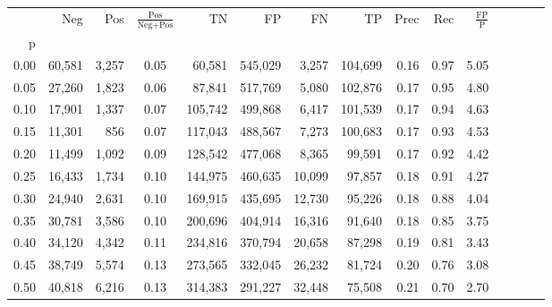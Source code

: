 \begin{tabular}{rrrcrrrrrrrrrrr}
\toprule
{} &     Neg &     Pos & $\frac{\text{Pos}}{\text{Neg}+\text{Pos}}$ &       TN &       FP &       FN &       TP &  Prec &   Rec & $\frac{\text{FP}}{\text{P}}$ \\
p    &         &         &                                            &          &          &          &          &       &       &                              \\
\midrule
0.00 &  60,581 &   3,257 &                                       0.05 &   60,581 &  545,029 &    3,257 &  104,699 &  0.16 &  0.97 &                         5.05 \\
0.05 &  27,260 &   1,823 &                                       0.06 &   87,841 &  517,769 &    5,080 &  102,876 &  0.17 &  0.95 &                         4.80 \\
0.10 &  17,901 &   1,337 &                                       0.07 &  105,742 &  499,868 &    6,417 &  101,539 &  0.17 &  0.94 &                         4.63 \\
0.15 &  11,301 &     856 &                                       0.07 &  117,043 &  488,567 &    7,273 &  100,683 &  0.17 &  0.93 &                         4.53 \\
0.20 &  11,499 &   1,092 &                                       0.09 &  128,542 &  477,068 &    8,365 &   99,591 &  0.17 &  0.92 &                         4.42 \\
0.25 &  16,433 &   1,734 &                                       0.10 &  144,975 &  460,635 &   10,099 &   97,857 &  0.18 &  0.91 &                         4.27 \\
0.30 &  24,940 &   2,631 &                                       0.10 &  169,915 &  435,695 &   12,730 &   95,226 &  0.18 &  0.88 &                         4.04 \\
0.35 &  30,781 &   3,586 &                                       0.10 &  200,696 &  404,914 &   16,316 &   91,640 &  0.18 &  0.85 &                         3.75 \\
0.40 &  34,120 &   4,342 &                                       0.11 &  234,816 &  370,794 &   20,658 &   87,298 &  0.19 &  0.81 &                         3.43 \\
0.45 &  38,749 &   5,574 &                                       0.13 &  273,565 &  332,045 &   26,232 &   81,724 &  0.20 &  0.76 &                         3.08 \\
0.50 &  40,818 &   6,216 &                                       0.13 &  314,383 &  291,227 &   32,448 &   75,508 &  0.21 &  0.70 &                         2.70 \\

\end{tabular}
